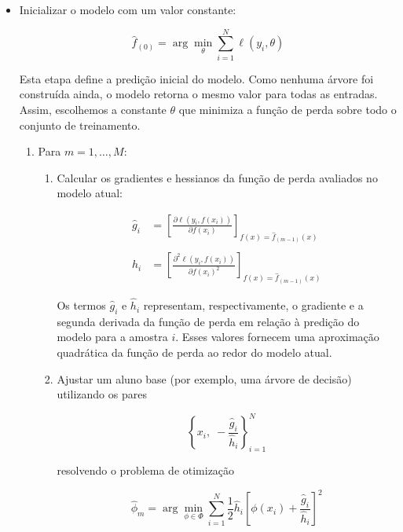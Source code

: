 \documentclass{article}
\begin{document}
\begin{itemize}

\item Inicializar o modelo com um valor constante:

\begin{equation}
\hat{f}_{(0)} = \arg \min_{\theta} \sum_{i=1}^{N} \ell(y_i, \theta)
\end{equation}

Esta etapa define a predição inicial do modelo. Como nenhuma árvore foi
construída ainda, o modelo retorna o mesmo valor para todas as entradas.
Assim, escolhemos a constante $\theta$ que minimiza a função de perda
sobre todo o conjunto de treinamento.

\begin{enumerate}

\item Para $m = 1, \dots, M$:

\begin{enumerate}

\item Calcular os gradientes e hessianos da função de perda avaliados no
modelo atual:

\begin{align*}
\hat{g}_i &= 
\left[\frac{\partial \ell(y_i, f(x_i))}{\partial f(x_i)}\right]_{f(x)=\hat{f}_{(m-1)}(x)} \\
\\
\hat{h}_i &=
\left[\frac{\partial^2 \ell(y_i, f(x_i))}{\partial f(x_i)^2}\right]_{f(x)=\hat{f}_{(m-1)}(x)}
\end{align*}

Os termos $\hat{g}_i$ e $\hat{h}_i$ representam, respectivamente, o
gradiente e a segunda derivada da função de perda em relação à predição
do modelo para a amostra $i$. Esses valores fornecem uma aproximação
quadrática da função de perda ao redor do modelo atual.

\item Ajustar um aluno base (por exemplo, uma árvore de decisão)
utilizando os pares

\[
\left\{x_i,\; -\frac{\hat{g}_i}{\hat{h}_i}\right\}_{i=1}^{N}
\]

resolvendo o problema de otimização

\begin{equation}
\hat{\phi}_m =
\arg \min_{\phi \in \Phi}
\sum_{i=1}^{N}
\frac{1}{2}\hat{h}_i
\left[
\phi(x_i) + \frac{\hat{g}_i}{\hat{h}_i}
\right]^2
\end{equation}


\end{enumerate}
\end{enumerate}
\end{itemize}
\end{document}
